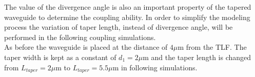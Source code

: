 The value of the divergence angle is also an important property of the tapered waveguide to determine the coupling ability. In order to simplify the modeling process the variation of taper length, instead of divergence angle, will be performed in the following coupling simulations. \\

As before the waveguide is placed at the distance of $4\mu$m from the TLF. The taper width is kept  as a constant of $d_{1}=2\mu$m and the taper length is changed from $L_{taper}=2\mu$m to $ L_{taper}=5.5\mu$m in following simulations.\\
  
